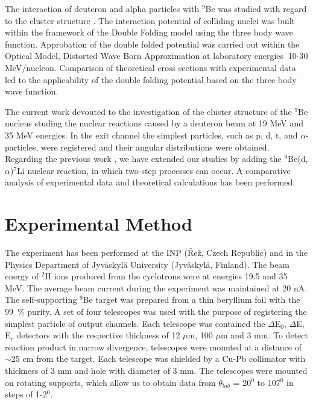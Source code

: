 \documentclass[10pt]{iopart}
\begin{document}
The interaction of deuteron and alpha particles with $^9$Be was studied with regard to the cluster structure \cite{urazbekov2016, urazbekov2017} . The interaction potential of colliding nuclei was built within the framework of the Double Folding model using the three body wave function. Approbation of the double folded potential was carried out within the Optical Model, Distorted Wave Born Approximation at laboratory energies $~$10-30 MeV/nucleon. Comparison of theoretical cross sections with experimental data led to the applicability of the double folding potential based on the three body wave function.

The current work devouted to the investigation of the cluster structure of the $^9$Be nucleus studing the nuclear reactions caused by a deuteron beam at 19 MeV and 35 MeV energies. In the exit channel the simplest particles, such as p, d, t, and $\alpha$-particles, were registered and their angular distributions were obtained. Regarding  the previous work \cite{urazbekov2017}, we have extended our studies by adding the $^9$Be(d,$\alpha$)$^7$Li nuclear reaction, in which  two-step processes can  occur. A comparative analysis of experimental data and theoretical calculations has been performed.
	



\section{Experimental Method}
The experiment has been performed at  the INP (\v{R}e\v{z}, Czech Republic) and  in the Physics Department of Jyv\"{a}skyl\"{a} University (Jyv\"askyl\"a, Finland).  The beam energy of $^2$H ions produced from the cyclotrons were at energies 19.5 and 35 MeV. The average beam current during the experiment was maintained at 20 nA. The self-supporting $^9$Be target was prepared from a thin beryllium foil with the 99~\% purity. A set of four telescopes was used with the purpose of registering the simplest particle of output channels. Each telescope was  contained the $\Delta$E$_0$, $\Delta$E, E$_r$ detectors with the respective thickness of 12 $\mu$m, 100 $\mu$m and 3 mm.
To detect reaction product in narrow divergence,  telescopes were mounted at a distance of $\sim$25 cm from the target. Each telescope was shielded by a Cu-Pb collimator with thickness of 3 mm and hole with diameter of 3 mm. 
The telescopes were mounted on rotating supports, which allow us to obtain data from $\theta_{lab}$ = 20$^{0}$ to 107$^{0}$ in steps of 1-2$^{0}$.
\end{document}
